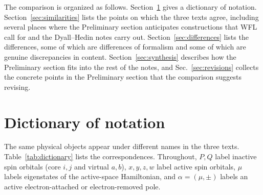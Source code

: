 \documentclass[11pt,a4paper]{article}
\newcommand{\WFL}{WFL}
\newcommand{\Pre}{Preliminary section}
\newcommand{\DHN}{Dyall--Hedin notes}
\begin{document}
The comparison is organized as follows.  Section~\ref{sec:dictionary} gives a
dictionary of notation.  Section~\ref{sec:similarities} lists the points on
which the three texts agree, including several places where the
\Pre{} anticipates constructions that \WFL{} call for and the
\DHN{} carry out.  Section~\ref{sec:differences} lists the differences, some of
which are differences of formalism and some of which are genuine
discrepancies in content.  Section~\ref{sec:synthesis} describes how the
\Pre{} fits into the rest of the notes, and Sec.~\ref{sec:revisions} collects
the concrete points in the \Pre{} that the comparison suggests revising.

\section{Dictionary of notation}
\label{sec:dictionary}

The same physical objects appear under different names in the three texts.
Table~\ref{tab:dictionary} lists the correspondences.  Throughout, $P,Q$ label
inactive spin orbitals (core $i,j$ and virtual $a,b$), $x,y,z,w$ label active
spin orbitals, $\mu$ labels eigenstates of the active-space Hamiltonian, and
$\alpha=(\mu,\pm)$ labels an active electron-attached or electron-removed pole.
\end{document}

